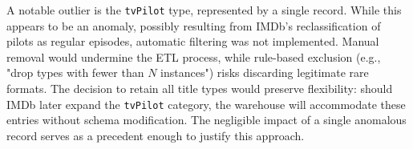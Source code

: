 A notable outlier is the \verb|tvPilot| type, represented by a single record. While this appears to be an anomaly, possibly resulting from IMDb's reclassification of pilots as regular episodes, automatic filtering was not implemented. Manual removal would undermine the ETL process, while rule-based exclusion (e.g., "drop types with fewer than $N$ instances") risks discarding legitimate rare formats. The decision to retain all title types would preserve flexibility: should IMDb later expand the \verb|tvPilot| category, the warehouse will accommodate these entries without schema modification. The negligible impact of a single anomalous record serves as a precedent enough to justify this approach.